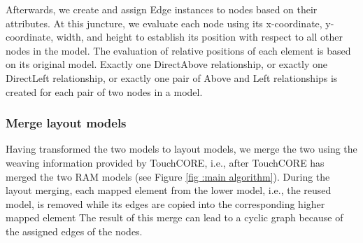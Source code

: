 Afterwards, we create and assign Edge instances to nodes based on their attributes. At this juncture, we evaluate each node using its x-coordinate, y-coordinate, width, and height to establish its position with respect to all other nodes in the model. The evaluation of relative positions of each element is based on its original model. Exactly one DirectAbove relationship, or exactly one DirectLeft relationship, or exactly one pair of Above and Left relationships is created for each pair of two nodes in a model.

\subsubsection{Merge layout models}
Having transformed the two models to layout models, we merge the two using the weaving information \cite{alam2013concern} provided by TouchCORE, i.e., after TouchCORE has merged the two RAM models (see Figure \ref{fig :main algorithm}). During the layout merging, each mapped element from the lower model, i.e., the reused model, is removed while its edges are copied into the corresponding higher mapped element The result of this merge can lead to a cyclic graph because of the assigned edges of the nodes.
